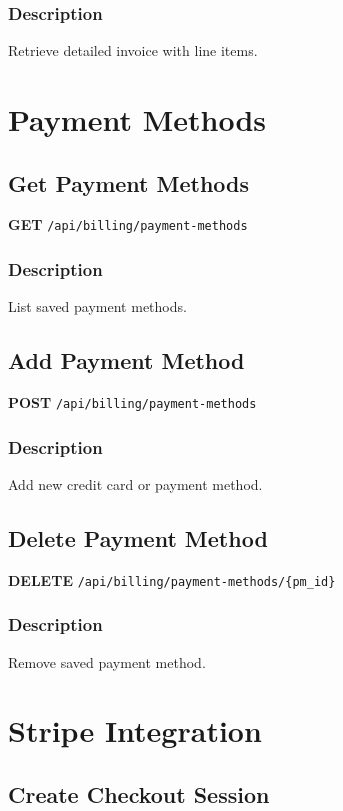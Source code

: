 \documentclass[11pt,a4paper]{report}
\begin{document}
\subsubsection{Description}
Retrieve detailed invoice with line items.

\section{Payment Methods}

\subsection{Get Payment Methods}

\textbf{GET} \texttt{/api/billing/payment-methods}

\subsubsection{Description}
List saved payment methods.

\subsection{Add Payment Method}

\textbf{POST} \texttt{/api/billing/payment-methods}

\subsubsection{Description}
Add new credit card or payment method.

\subsection{Delete Payment Method}

\textbf{DELETE} \texttt{/api/billing/payment-methods/\{pm\_id\}}

\subsubsection{Description}
Remove saved payment method.

\section{Stripe Integration}

\subsection{Create Checkout Session}
\end{document}
